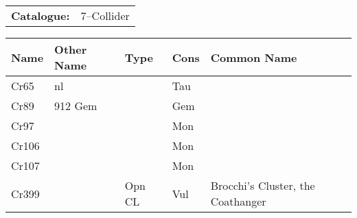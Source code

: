 \begin{tabular}{ p{0.9in} p{1.3in}}
{\bf Catalogue:} & 7--Collider \\ 
\end{tabular}
\begin{longtable}{ p{0.7in}  p{1.0in}  p{0.6in}  p{0.9in}  p{5.1in} }
\hline 
{\bf Name} & {\bf Other Name} & {\bf Type} & {\bf Cons} & {\bf Common Name} \\ 
\hline 
Cr65 & nl &  & Tau &  \\ 
Cr89 & 912 Gem &  & Gem &  \\ 
Cr97 &  &  & Mon &  \\ 
Cr106 &  &  & Mon &  \\ 
Cr107 &  &  & Mon &  \\ 
Cr399 &  & Opn CL & Vul & Brocchi's Cluster, the Coathanger \\ 
\hline 
\end{longtable} 
